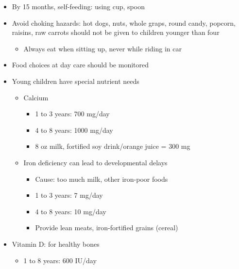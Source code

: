 \documentclass[12pt]{article}
\begin{document}
\begin{itemize}
\begin{itemize}
                    \end{itemize}
                \item By 15 months, self-feeding: using cup, spoon
                \item Avoid choking hazards: hot dogs, nuts, whole graps, round candy, popcorn, raisins, raw carrots should not be given to children younger than four
                    \begin{itemize}
                        \item Always eat when sitting up, never while riding in car
                    \end{itemize}
                \item Food choices at day care should be monitored
                \item Young children have special nutrient needs
                    \begin{itemize}
                        \item Calcium
                            \begin{itemize}
                                \item 1 to 3 years: 700 mg/day
                                \item 4 to 8 years: 1000 mg/day
                                \item 8 oz milk, fortified soy drink/orange juice = 300 mg
                            \end{itemize}
                        \item Iron deficiency can lead to developmental delays
                            \begin{itemize}
                                \item Cause: too much milk, other iron-poor foods
                                \item 1 to 3 years: 7 mg/day
                                \item 4 to 8 years: 10 mg/day
                                \item Provide lean meats, iron-fortified grains (cereal)
                            \end{itemize}
                    \end{itemize}
                \item Vitamin D: for healthy bones
                    \begin{itemize}
                        \item 1 to 8 years: 600 IU/day

\end{itemize}
\end{itemize}
\end{document}
